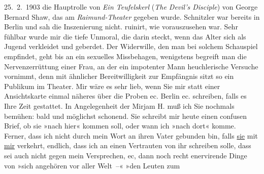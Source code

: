 \begin{ledgroupsized}[t]{13cm}
{{{                     25. 2. 1903 die Hauptrolle von \emph{Ein Teufelskerl} (\emph{The
                     Devil’s Disciple}) von George Bernard
                     Shaw, das am \emph{Raimund-Theater} gegeben
                  wurde. Schnitzler war bereits in Berlin und sah die Inszenierung nicht.}}}\label{K_L03339-3h}
               ruinirt, wie vorauszusehen war. Sehr fühlbar wurde mir die tiefe Unmoral, die darin
               steckt, wenn das Alter sich als Jugend verkleidet und geberdet. Der Widerwille, den
               man bei solchem Schauspiel empfindet, geht bis an ein sexuelles Missbehagen,
               wenigstens begreift man die Nervenzerrüttung einer Frau, an der ein impotenter Mann
               heuchlerische Versuche vornimmt, denn mit ähnlicher Bereitwilligkeit zur Empfängnis
               sitzt so ein Publikum im Theater. Mir wäre es sehr lieb, wenn Sie mir statt einer
               Ansichtskarte einmal näheres über die Proben ec. Berlin ec. schreiben, falls es Ihre Zeit gestattet. \pend
           \pstart
           In Angelegenheit der Mirjam H. muß ich Sie
               nochmals bemühen: bald und möglichst schonend. Sie schreibt mir heute einen confusen
               Brief, ob sie »nach hier« kommen soll, oder wann ich »nach dort« komme. Ferner, dass
               ich nicht durch mein Wort an ihren Vater gebunden bin, falls \uline{sie} mit \uline{mir} verkehrt, endlich, dass ich an
               einen Vertrauten von ihr schreiben solle, dass sei auch nicht gegen mein Versprechen,
               ec, dann noch recht enervirende Dinge von »sich angehören vor aller {\pb}Welt –« »den Leuten zum

\end{ledgroupsized}
